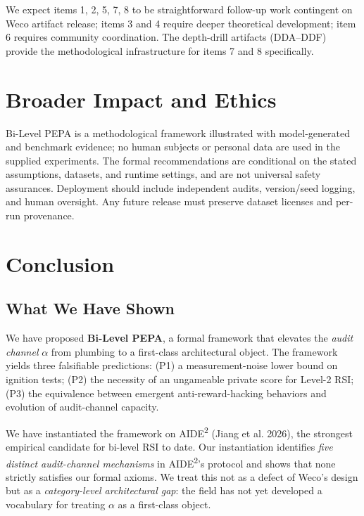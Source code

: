 \documentclass{article}
\theoremstyle{definition}
\begin{document}
We expect items 1, 2, 5, 7, 8 to be straightforward follow-up work contingent on Weco artifact release; items 3 and 4 require deeper theoretical development; item 6 requires community coordination. The depth-drill artifacts (DDA--DDF) provide the methodological infrastructure for items 7 and 8 specifically.


\section{Broader Impact and Ethics}
Bi-Level PEPA is a methodological framework illustrated with model-generated and benchmark evidence; no human subjects or personal data are used in the supplied experiments. The formal recommendations are conditional on the stated assumptions, datasets, and runtime settings, and are not universal safety assurances. Deployment should include independent audits, version/seed logging, and human oversight. Any future release must preserve dataset licenses and per-run provenance.

\section{Conclusion}

\subsection{What We Have Shown}

We have proposed \textbf{Bi-Level PEPA}, a formal framework that elevates the \emph{audit channel} $\alpha$ from plumbing to a first-class architectural object. The framework yields three falsifiable predictions: (P1) a measurement-noise lower bound on ignition tests; (P2) the necessity of an ungameable private score for Level-2 RSI; (P3) the equivalence between emergent anti-reward-hacking behaviors and evolution of audit-channel capacity.

We have instantiated the framework on AIDE\textsuperscript{2} (Jiang et al. 2026), the strongest empirical candidate for bi-level RSI to date. Our instantiation identifies \emph{five distinct audit-channel mechanisms} in AIDE\textsuperscript{2}'s protocol and shows that none strictly satisfies our formal axioms. We treat this not as a defect of Weco's design but as a \emph{category-level architectural gap}: the field has not yet developed a vocabulary for treating $\alpha$ as a first-class object.
\end{document}
